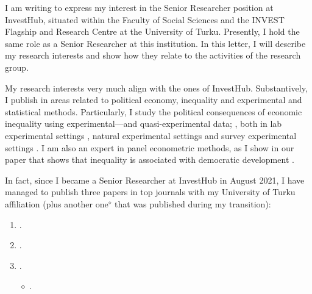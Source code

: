 \documentclass[10pt,stdletter,dateno,sigleft]{newlfm} %
\begin{document}
\begin{newlfm}


\vspace{-2cm}I am writing to express my interest in the Senior Researcher position at InvestHub, situated within the Faculty of Social Sciences and the INVEST Flagship and Research Centre at the University of Turku. Presently, I hold the same role as a Senior Researcher at this institution. In this letter, I will describe my research interests and show how they relate to the activities of the research group.

My research interests very much align with the ones of InvestHub. Substantively, I publish in areas related to political economy, inequality and experimental and statistical methods. Particularly, I study the political consequences of economic inequality using experimental---and quasi-experimental data; \textcite{Bahamonde2018}, both in lab experimental settings \parencite{Bahamonde2022b}, natural experimental settings \parencite{Bahamonde:2023} and survey experimental settings \parencite{Bahamonde2020a}. I am also an expert in panel econometric methods, as I show in our paper that shows that inequality is associated with democratic development \parencite{Bahamonde2021}. 

In fact, since I became a Senior Researcher at InvestHub in August 2021, I have managed to publish three papers in top journals with my University of Turku affiliation (plus another one$^{\diamond}$ that was published during my transition):

\begin{enumerate}
  \item \href{https://doi.org/10.1111/pops.12940}{}.
  \item \href{https://doi.org/10.1016/j.electstud.2022.102497}{}.
  \item \href{https://doi.org/10.1016/j.ejpoleco.2021.102048}{}.
  \item[$\diamond$] \href{https://link.springer.com/article/10.1057/s41269-020-00174-4}{}.
\end{enumerate}




\end{newlfm}
\end{document}
